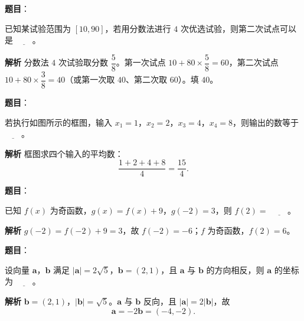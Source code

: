 \begin{answer}

\textbf{题目}：

已知某试验范围为 $[10,90]$，若用分数法进行 $4$ 次优选试验，则第二次试点可以是 $\underline{\qquad}$。

\textbf{解析}
分数法 $4$ 次试验取分数 $\dfrac58$。第一次试点 $10+80\times\dfrac58=60$，第二次试点 $10+80\times\dfrac38=40$（或第一次取 $40$、第二次取 $60$）。填 $40$。


\end{answer}
\begin{answer}

\textbf{题目}：

若执行如图所示的框图，输入 $x_1=1$，$x_2=2$，$x_3=4$，$x_4=8$，则输出的数等于 $\underline{\qquad}$。
\nopagebreak[4]
\begin{center}\end{center}
\nopagebreak[4]
\textbf{解析}
框图求四个输入的平均数：
\nopagebreak[4]
\[\frac{1+2+4+8}4=\frac{15}4.\]


\end{answer}
\begin{answer}

\textbf{题目}：

已知 $f(x)$ 为奇函数，$g(x)=f(x)+9$，$g(-2)=3$，则 $f(2)=$ $\underline{\qquad}$。

\textbf{解析}
$g(-2)=f(-2)+9=3$，故 $f(-2)=-6$；$f$ 为奇函数，$f(2)=6$。


\end{answer}
\begin{answer}

\textbf{题目}：

设向量 $\boldsymbol a$，$\boldsymbol b$ 满足 $|\boldsymbol a|=2\sqrt5$，$\boldsymbol b=(2,1)$，且 $\boldsymbol a$ 与 $\boldsymbol b$ 的方向相反，则 $\boldsymbol a$ 的坐标为 $\underline{\qquad}$。

\textbf{解析}
$\boldsymbol b=(2,1)$，$|\boldsymbol b|=\sqrt5$。$\boldsymbol a$ 与 $\boldsymbol b$ 反向，且 $|\boldsymbol a|=2|\boldsymbol b|$，故
\nopagebreak[4]
\[\boldsymbol a=-2\boldsymbol b=(-4,-2).\]


\end{answer}
